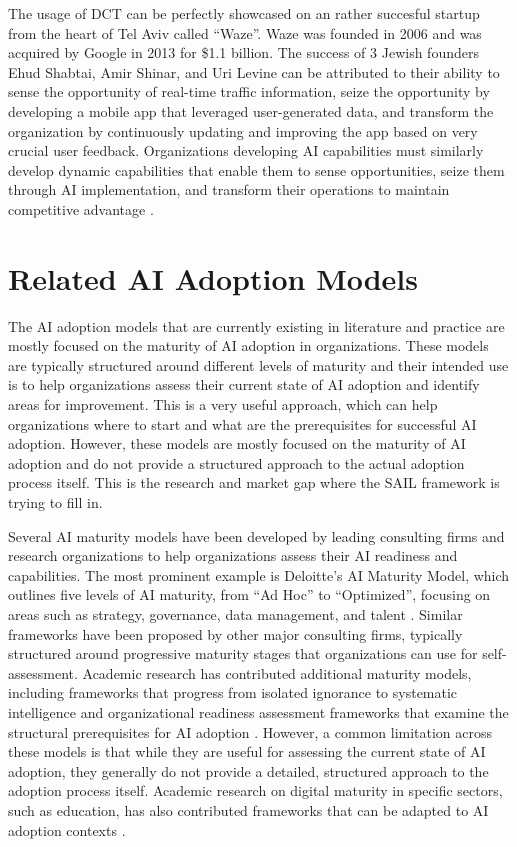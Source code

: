 \documentclass[]{imc-inf}
\begin{document}
The usage of DCT can be perfectly showcased on an rather succesful
startup from the heart of Tel Aviv called ``Waze''. Waze was founded in
2006 and was acquired by Google in 2013 for \$1.1 billion. The success
of 3 Jewish founders Ehud Shabtai, Amir Shinar, and Uri Levine can be
attributed to their ability to sense the opportunity of real-time
traffic information, seize the opportunity by developing a mobile app
that leveraged user-generated data, and transform the organization by
continuously updating and improving the app based on very crucial user
feedback. Organizations developing AI capabilities must similarly develop dynamic capabilities that enable them to sense opportunities, seize them through AI implementation, and transform their operations to maintain competitive advantage \citep{Mikalef2021, Wamba2021}.

\section{Related AI Adoption Models}

The AI adoption models that are currently existing in literature and
practice are mostly focused on the maturity of AI adoption in
organizations. These models are typically structured around different
levels of maturity and their intended use is to help organizations
assess their current state of AI adoption and identify areas for
improvement. This is a very useful approach, which can help
organizations where to start and what are the prerequisites for
successful AI adoption. However, these models are mostly focused on the
maturity of AI adoption and do not provide a structured approach to the
actual adoption process itself. This is the research and market gap
where the SAIL framework is trying to fill in.

Several AI maturity models have been developed by leading consulting firms and 
research organizations to help organizations assess their AI readiness and capabilities.
The most prominent example is Deloitte's AI Maturity Model, which outlines five levels 
of AI maturity, from ``Ad Hoc'' to ``Optimized'', focusing on areas such as strategy, 
governance, data management, and talent \citep{DeloitteInsights2023}. Similar frameworks have been 
proposed by other major consulting firms, typically structured around progressive maturity 
stages that organizations can use for self-assessment. Academic research has contributed 
additional maturity models, including frameworks that progress from isolated ignorance to 
systematic intelligence \citep{Lichtenthaler2020} and organizational readiness assessment 
frameworks that examine the structural prerequisites for AI adoption \citep{Pumplun2019}. However, a common limitation across 
these models is that while they are useful for assessing the current state of AI adoption, 
they generally do not provide a detailed, structured approach to the adoption process itself.
Academic research on digital maturity in specific sectors, such as education, has also 
contributed frameworks that can be adapted to AI adoption contexts \citep{AlAli2022}.
\end{document}
